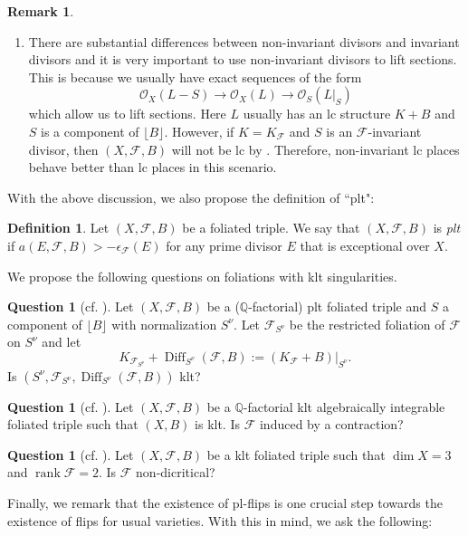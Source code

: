 \documentclass[11pt]{amsart}
\numberwithin{equation}{section}
\newcommand{\Qq}{\mathbb{Q}}
\newcommand{\rk}{\operatorname{rank}}
\newcommand{\Diff}{\operatorname{Diff}}
\newcommand{\Ff}{\mathcal{F}}
\theoremstyle{definition}
\newtheorem{defn}[thm]{Definition}
\newtheorem{ques}[thm]{Question}
\theoremstyle{definition}
\newtheorem{rem}[thm]{Remark}
\theoremstyle{definition}
\begin{document}
\begin{rem}
\begin{enumerate}
         \item There are substantial differences between non-invariant divisors and invariant divisors and it is very important to use non-invariant divisors to lift sections. This is because we usually have exact sequences of the form
         $$\mathcal{O}_X(L-S)\rightarrow\mathcal{O}_X(L)\rightarrow\mathcal{O}_S(L|_S)$$
         which allow us to lift sections. Here $L$ usually has an lc structure $K+B$ and $S$ is a component of  $\lfloor B\rfloor$. However, if $K=K_{\Ff}$ and $S$ is an $\Ff$-invariant divisor, then $(X,\Ff,B)$ will not be lc by \cite[Remark 2.3]{CS21}. Therefore, non-invariant lc places behave better than lc places in this scenario.
       \end{enumerate}
\end{rem}
With the above discussion, we also propose the definition of ``plt":
\begin{defn}
    Let $(X,\Ff,B)$ be a foliated triple. We say that $(X,\Ff,B)$ is \emph{plt} if  $a(E,\Ff,B)>-\epsilon_{\Ff}(E)$ for any prime divisor $E$ that is exceptional over $X$.
\end{defn}

We propose the following questions on foliations with klt singularities.
\begin{ques}[cf. {\cite[Theorem 1.1]{CS23b}}]
   Let $(X,\Ff,B)$ be a ($\mathbb Q$-factorial) plt foliated triple and $S$ a component of $\lfloor B\rfloor$ with normalization $S^\nu$. Let $\Ff_{S^\nu}$ be the restricted foliation of $\Ff$ on $S^\nu$ and let
   $$K_{\Ff_{S^\nu}}+\Diff_{S^\nu}(\Ff,B):=(K_{\Ff}+B)|_{S^\nu}.$$
   Is
   $(S^\nu,\Ff_{S^\nu},\Diff_{S^\nu}(\Ff,B))$ klt?
\end{ques}

\begin{ques}[cf. {\cite[Conjecture 4.2(2)]{CS23a}}]
    Let $(X,\Ff,B)$ be a $\Qq$-factorial klt algebraically integrable foliated triple such that $(X,B)$ is klt. Is $\Ff$ induced by a contraction?
\end{ques}

\begin{ques}[cf. {\cite[Theorem 11.3]{CS21}}]
    Let $(X,\Ff,B)$ be a klt foliated triple such that $\dim X=3$ and $\rk\Ff=2$. Is $\Ff$ non-dicritical?
\end{ques}

Finally, we remark that the existence of pl-flips is one crucial step towards the existence of flips for usual varieties. With this in mind, we ask the following:
\end{document}
